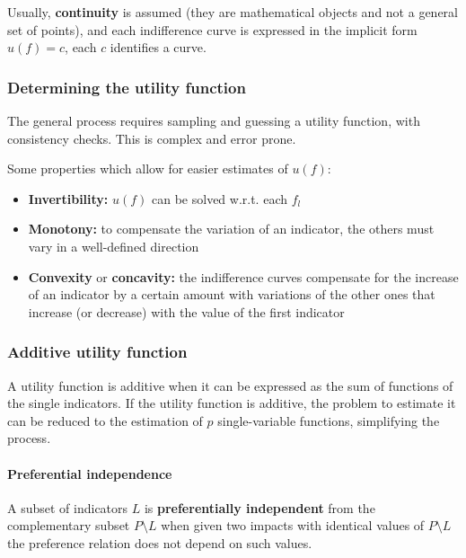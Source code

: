 Usually, \textbf{continuity} is assumed (they are mathematical objects and not a general set of points), and each indifference curve is expressed in the implicit form $ u(f) = c$, each $c$ identifies a curve.


\subsubsection{Determining the utility function}

The general process requires sampling and guessing a utility function, with consistency checks. This is complex and error prone. 

Some properties which allow for easier estimates of $u(f)$: 
\begin{itemize}
	\item \textbf{Invertibility:} $u(f)$ can be solved w.r.t. each $f_l$
	
	\item \textbf{Monotony:} to compensate the variation of an indicator, the others must vary in a well-defined direction
	
	\item \textbf{Convexity} or \textbf{concavity:} the indifference curves compensate for the increase 	of an indicator by a certain amount with variations of the other ones that increase (or decrease) with the value of the first indicator
\end{itemize}

\subsubsection{Additive utility function}

A utility function is additive when it can be expressed as the sum of functions of the single indicators. If the utility function is additive, the problem to estimate it can be reduced to the estimation of $p$ single-variable functions, simplifying the process.

\paragraph{Preferential independence} A subset of indicators $L$ is \textbf{preferentially independent} from the complementary subset $P \setminus L$ when given two impacts with identical values of $P \setminus L$ the preference relation does not depend on such values.

